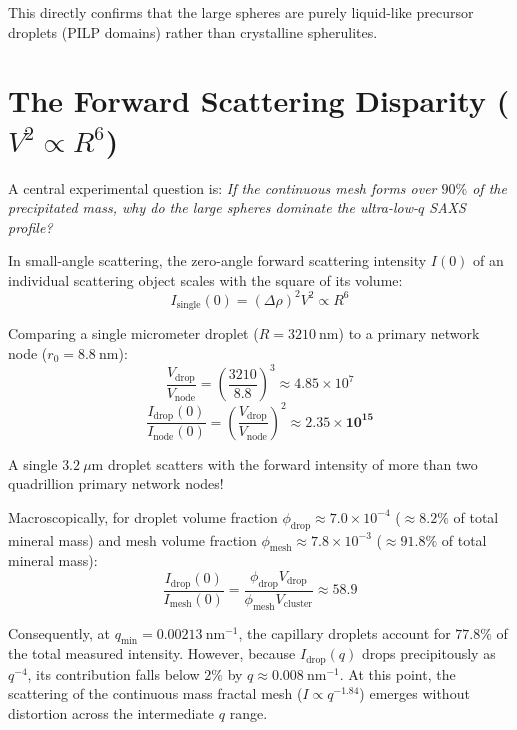 \documentclass[11pt,a4paper]{article}
\begin{document}
This directly confirms that the large spheres are purely liquid-like precursor droplets (PILP domains) rather than crystalline spherulites.

\section{The Forward Scattering Disparity ($V^2 \propto R^6$)}

A central experimental question is: \emph{If the continuous mesh forms over $90\%$ of the precipitated mass, why do the large spheres dominate the ultra-low-$q$ SAXS profile?}

In small-angle scattering, the zero-angle forward scattering intensity $I(0)$ of an individual scattering object scales with the square of its volume:
\begin{equation}
I_{\mathrm{single}}(0) = (\Delta \rho)^2 V^2 \propto R^6
\end{equation}

Comparing a single micrometer droplet ($R = 3210\ \mathrm{nm}$) to a primary network node ($r_0 = 8.8\ \mathrm{nm}$):
\begin{equation}
\frac{V_{\mathrm{drop}}}{V_{\mathrm{node}}} = \left(\frac{3210}{8.8}\right)^3 \approx 4.85 \times 10^7
\end{equation}
\begin{equation}
\frac{I_{\mathrm{drop}}(0)}{I_{\mathrm{node}}(0)} = \left(\frac{V_{\mathrm{drop}}}{V_{\mathrm{node}}}\right)^2 \approx \mathbf{2.35 \times 10^{15}}
\end{equation}

A single $3.2\ \mu\mathrm{m}$ droplet scatters with the forward intensity of more than two quadrillion primary network nodes!

Macroscopically, for droplet volume fraction $\phi_{\mathrm{drop}} \approx 7.0 \times 10^{-4}$ ($\approx 8.2\%$ of total mineral mass) and mesh volume fraction $\phi_{\mathrm{mesh}} \approx 7.8 \times 10^{-3}$ ($\approx 91.8\%$ of total mineral mass):
\begin{equation}
\frac{I_{\mathrm{drop}}(0)}{I_{\mathrm{mesh}}(0)} = \frac{\phi_{\mathrm{drop}} V_{\mathrm{drop}}}{\phi_{\mathrm{mesh}} V_{\mathrm{cluster}}} \approx \mathbf{58.9}
\end{equation}

Consequently, at $q_{\mathrm{min}} = 0.00213\ \mathrm{nm}^{-1}$, the capillary droplets account for \textbf{$77.8\%$} of the total measured intensity. However, because $I_{\mathrm{drop}}(q)$ drops precipitously as $q^{-4}$, its contribution falls below $2\%$ by $q \approx 0.008\ \mathrm{nm}^{-1}$. At this point, the scattering of the continuous mass fractal mesh ($I \propto q^{-1.84}$) emerges without distortion across the intermediate $q$ range.
\end{document}
